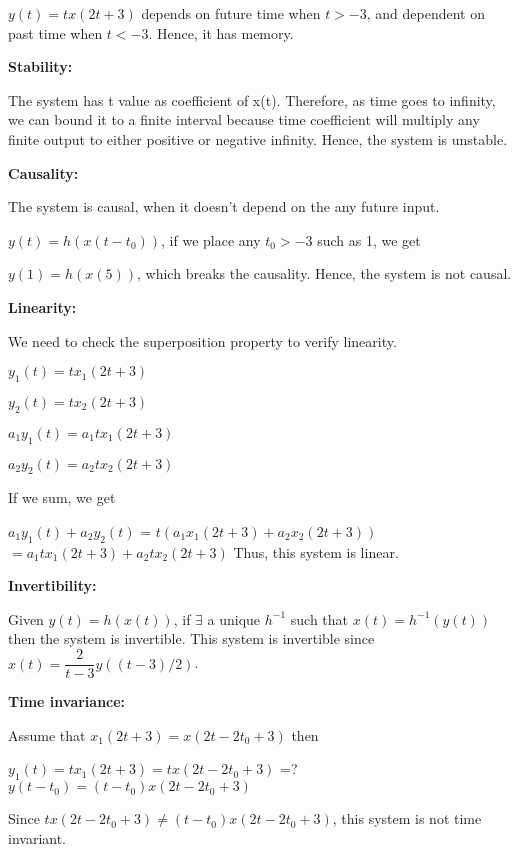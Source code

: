 \documentclass[10pt,a4paper, margin=1in]{article}
\begin{document}
\begin{enumerate}
\begin{enumerate}
    $y(t) = tx(2t+3)$ depends on future time when $t>-3$, 
    and dependent on past time when $t<-3$. Hence, it has memory.
    

    \textbf{Stability:}
    
    The system has t value as coefficient of x(t). Therefore, as time goes to infinity, we can bound it to a finite interval because time coefficient will multiply any finite output to either positive or negative infinity. Hence, the system is unstable.
    

    \textbf{Causality:}
    
    The system is causal, when it doesn't depend on the any future input.
    
    $y(t)=h(x(t-t_0))$, if we place any $t_0>-3$ such as 1, we get
    
    $y(1)=h(x(5))$, which breaks the causality. Hence, the system is not causal.

    \textbf{Linearity:}
    
    We need to check the superposition property to verify linearity.
    
    $y_1(t) = tx_1(2t+3)$ 
    
    $y_2(t) = tx_2(2t+3)$ 
    \vspace{0.25cm}
    
    $a_1 y_1(t) = a_1tx_1(2t+3)$ 
    
    $a_2 y_2(t) = a_2tx_2(2t+3)$ 
    
    If we sum, we get
    \vspace{0.25cm}
    
    $a_1 y_1(t) + a_2 y_2(t)$ = $t(a_1x_1(2t+3)+a_2x_2(2t+3))$
    $=a_1tx_1(2t+3)+a_2tx_2(2t+3)$ 
    Thus, this system is linear.
    
    \textbf{Invertibility:}
    
    Given $y(t) = h(x(t))$, if $\exists$ a unique $h^{-1}$ such that 
    $x(t) = h^{-1}(y(t))$ then the system is invertible. 
    This system is invertible since $x(t) = \dfrac{2}{t-3}y((t-3)/2)$.  
    
    \textbf{Time invariance:}
    
    Assume that $x_1(2t+3)=x(2t-2t_0+3)$ then
    \vspace{0.25cm}
    
    $y_1(t)=tx_1(2t+3)=tx(2t-2t_0+3)$ =? $y(t-t_0)=(t-t_0)x(2t-2t_0+3)$
    
    Since $tx(2t-2t_0+3) \neq (t-t_0)x(2t-2t_0+3)$, this system is not time invariant. 
    

\end{enumerate}
\end{enumerate}
\end{document}
